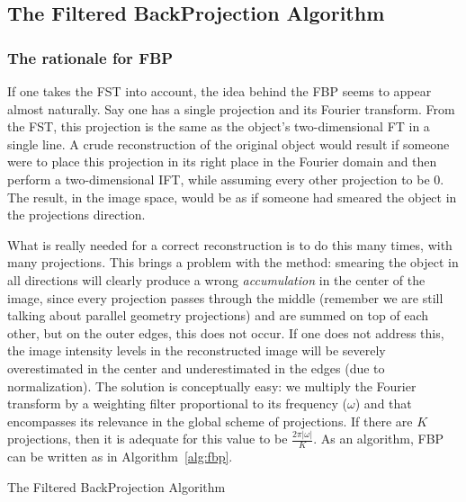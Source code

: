 \subsection{The Filtered BackProjection Algorithm}%
\label{sub:the_filtered_backprojection_algorithm}

\subsubsection{The rationale for \gls{FBP}}%
\label{ssub:the_rationale_for_fbp}

If one takes the \gls{FST} into account, the idea behind the \gls{FBP}
seems to appear almost naturally. Say one has a single projection and
its Fourier transform. From the \gls{FST}, this projection is the same
as the object's two-dimensional \gls{FT} in a single line. A crude
reconstruction of the original object would result if someone were to
place this projection in its right place in the Fourier domain and then
perform a two-dimensional \gls{IFT}, while assuming every other
projection to be 0. The result, in the image space, would be as if
someone had smeared the object in the projections direction.

What is really needed for a correct reconstruction is to do this many
times, with many projections. This brings a problem with the method:
smearing the object in all directions will clearly produce a wrong
\emph{accumulation} in the center of the image, since every projection
passes through the middle (remember we are still talking about parallel
geometry projections) and are summed on top of each other, but on the
outer edges, this does not occur. If one does not address this, the
image intensity levels in the reconstructed image will be severely
overestimated in the center and underestimated in the edges (due to
normalization). The solution is conceptually easy: we multiply the
Fourier transform by a weighting filter proportional to its frequency
($\omega$) and that encompasses its relevance in the global scheme of
projections. If there are $K$ projections, then it is adequate for this
value to be $\frac{2\pi\lvert\omega\rvert}{K}$. As an algorithm,
\gls{FBP} can be written as in Algorithm~\ref{alg:fbp}.

\begin{algorithm}
    \caption{The Filtered BackProjection Algorithm}
    \label{alg:fbp}
    \begin{algorithmic}
    \ENDFOR
    \end{algorithmic}
\end{algorithm}

